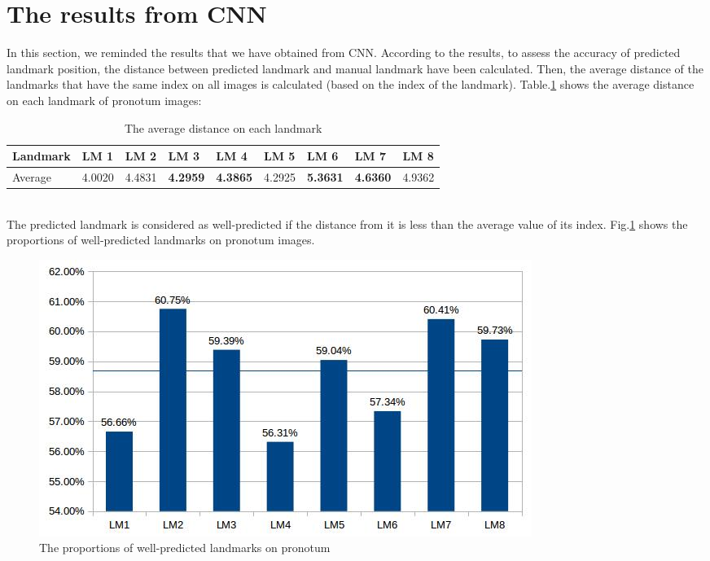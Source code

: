 \documentclass[12pt,a4paper]{article}
\begin{document}
\section{The results from CNN}
In this section, we reminded the results that we have obtained from CNN. According to the results, to assess the accuracy of predicted landmark position, the distance between predicted landmark and manual landmark have been calculated. Then, the average distance of the landmarks that have the same index on all images is calculated (based on the index of the landmark). Table.\ref{avgdistance1} shows the average distance on each landmark of pronotum images:\\
\begin{table}[h!]
	\centering
	\begin{tabular}{l l l l l l l l l}
	 Landmark& LM 1 & LM 2 & \textbf{LM 3} & \textbf{LM 4} & LM 5 & \textbf{LM 6} & \textbf{LM 7} & LM 8 \\ \hline
 	 Average & 4.0020 &	4.4831 & \textbf{4.2959} & \textbf{4.3865} &	 4.2925 & \textbf{5.3631} & \textbf{4.6360} &	4.9362
 \\ \hline
	\end{tabular}
	\caption{The average distance on each landmark }
	\label{avgdistance1}
\end{table}~\\
The predicted landmark is considered as well-predicted if the distance from it is less than the average value of its index. Fig.\ref{wellpredicted} shows the proportions of well-predicted landmarks on pronotum images.
\begin{figure}[h!]
	\centering
	\includegraphics[scale=0.5]{images/pronotum_avg_eval}
	\caption{The proportions of well-predicted landmarks on pronotum}
	\label{wellpredicted}
\end{figure}
\end{document}
